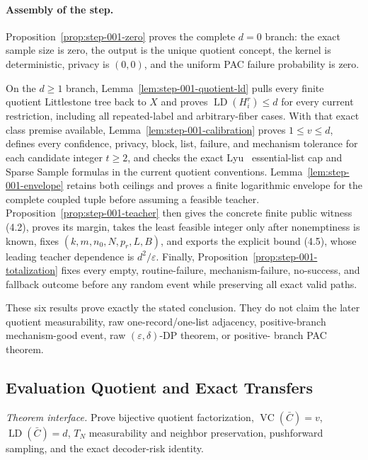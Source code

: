 \paragraph{Assembly of the step.}


Proposition~\ref{prop:step-001-zero} proves the complete \(d=0\) branch:
the exact sample size is zero, the output is the unique quotient concept,
the kernel is deterministic, privacy is \((0,0)\), and the uniform PAC
failure probability is zero.

On the \(d\ge1\) branch,
Lemma~\ref{lem:step-001-quotient-ld} pulls every finite quotient
Littlestone tree back to \(X\) and proves
\(\operatorname{LD}(H_i^r)\le d\) for every current restriction, including
all repeated-label and arbitrary-fiber cases. With that exact class premise
available, Lemma~\ref{lem:step-001-calibration} proves \(1\le v\le d\),
defines every confidence, privacy, block, list, failure, and mechanism
tolerance for each candidate integer \(t\ge2\), and checks the exact Lyu~\citep{lyu2025}
essential-list cap and Sparse Sample formulas in the current quotient
conventions. Lemma~\ref{lem:step-001-envelope} retains both ceilings and
proves a finite logarithmic envelope for the complete coupled tuple before
assuming a feasible teacher. Proposition~\ref{prop:step-001-teacher} then
gives the concrete finite public witness (4.2), proves its margin, takes the
least feasible integer only after nonemptiness is known, fixes
\((k,m,n_0,N,p_r,L,B)\), and exports the explicit bound (4.5), whose leading
teacher dependence is \(d^2/\varepsilon\). Finally,
Proposition~\ref{prop:step-001-totalization} fixes every empty,
routine-failure, mechanism-failure, no-success, and fallback outcome before
any random event while preserving all exact valid paths.

These six results prove exactly the stated conclusion. They do not claim the later
quotient measurability, raw one-record/one-list adjacency, positive-branch
mechanism-good event, raw \((\varepsilon,\delta)\)-DP theorem, or positive-
branch PAC theorem.



\subsection{Evaluation Quotient and Exact Transfers}\label{app:step_002}

\noindent\textit{Theorem interface.} Prove bijective quotient factorization,   \(\operatorname{VC}(\bar C)=v\), \(\operatorname{LD}(\bar C)=d\),   \(T_N\) measurability and neighbor preservation, pushforward sampling, and   the exact decoder-risk identity.

